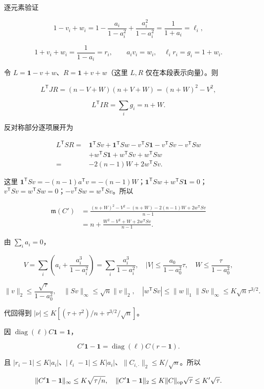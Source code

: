 \documentclass[11pt,a4paper]{article}
\begin{document}
逐元素验证

\[
1-v_i+w_i=1-\frac{a_i}{1-a_i^2}+\frac{a_i^2}{1-a_i^2}
=\frac1{1+a_i}=\ell_i,
\]

\[
1+v_i+w_i=\frac1{1-a_i}=r_i,\qquad
a_iv_i=w_i,\quad \ell_ir_i=g_i=1+w_i.
\]

令 \(L=\mathbf1-v+w\)、\(R=\mathbf1+v+w\)（这里 \(L,R\) 仅在本段表示向量）。则

\[
L^{\mathsf T}JR=(n-V+W)(n+V+W)=(n+W)^2-V^2,
\]

\[
L^{\mathsf T}IR=\sum_i g_i=n+W.
\]

反对称部分逐项展开为

\[
\begin{aligned}
L^{\mathsf T}SR
={}&\mathbf1^{\mathsf T}Sv+\mathbf1^{\mathsf T}Sw
-v^{\mathsf T}S\mathbf1-v^{\mathsf T}Sv-v^{\mathsf T}Sw\\
&+w^{\mathsf T}S\mathbf1+w^{\mathsf T}Sv+w^{\mathsf T}Sw\\
={}&-2(n-1)W+2w^{\mathsf T}Sv.
\end{aligned}
\]

这里 \(\mathbf1^{\mathsf T}Sv=-(n-1)a^{\mathsf T}v=-(n-1)W\)；\(\mathbf1^{\mathsf T}Sw+w^{\mathsf T}S\mathbf1=0\)；\(v^{\mathsf T}Sv=w^{\mathsf T}Sw=0\)；\(-v^{\mathsf T}Sw=w^{\mathsf T}Sv\)。所以

\[
\begin{aligned}
\mathfrak m(C')&=\frac{(n+W)^2-V^2-(n+W)-2(n-1)W+2w^{\mathsf T}Sv}{n-1}\\
&=n+\frac{W^2-V^2+W+2w^{\mathsf T}Sv}{n-1}.
\end{aligned}
\]

由 \(\sum_i a_i=0\)，

\[
V=\sum_i\left(a_i+\frac{a_i^3}{1-a_i^2}\right)
=\sum_i\frac{a_i^3}{1-a_i^2},\quad
|V|\le\frac{a_0}{1-a_0^2}\tau,
\quad W\le\frac\tau{1-a_0^2},
\]

\[
\|v\|_2\le\frac{\sqrt\tau}{1-a_0^2},\quad
\|Sv\|_\infty\le\sqrt n\|v\|_2,\quad
|w^{\mathsf T}Sv|\le\|w\|_1\|Sv\|_\infty\le K\sqrt n\tau^{3/2}.
\]

代回得到 \(|\nu|\le K[(\tau+\tau^2)/n+\tau^{3/2}/\sqrt n]\)。

因 \(\operatorname{diag}(\ell)C\mathbf1=\mathbf1\)，

\[
C'\mathbf1-\mathbf1=\operatorname{diag}(\ell)C(r-\mathbf1).
\]

且 \(|r_i-1|\le K|a_i|\)、\(|\ell_i-1|\le K|a_i|\)、\(\|C_{i,\cdot}\|_2\le K/\sqrt n\)。所以

\[
\|C'\mathbf1-\mathbf1\|_\infty\le K\sqrt{\tau/n},\quad
\|C'\mathbf1-\mathbf1\|_2\le K\|C\|_{\rm op}\sqrt\tau\le K'\sqrt\tau.
\]
\end{document}

